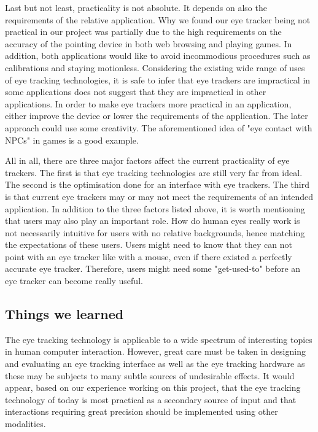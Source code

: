 \documentclass[english]{tktltiki}
\begin{document}
Last but not least, practicality is not absolute. It depends on also the requirements of the relative application. Why we found our eye tracker being not practical in our project was partially due to the high requirements on the accuracy of the pointing device in both web browsing and playing games. In addition, both applications would like to avoid incommodious procedures such as calibrations and staying motionless. Considering the existing wide range of uses of eye tracking technologies, it is safe to infer that eye trackers are impractical in some applications does not suggest that they are impractical in other applications. In order to make eye trackers more practical in an application, either improve the device or lower the requirements of the application. The later approach could use some creativity. The aforementioned idea of "eye contact with NPCs" in games is a good example. 

All in all, there are three major factors affect the current practicality of eye trackers. The first is that eye tracking technologies are still very far from ideal. The second is the optimisation done for an interface with eye trackers. The third is that current eye trackers may or may not meet the requirements of an intended application. In addition to the three factors listed above, it is worth mentioning that users may also play an important role. How do human eyes really work is not necessarily intuitive for users with no relative backgrounds, hence matching the expectations of these users. Users might need to know that they can not point with an eye tracker like with a mouse, even if there existed a perfectly accurate eye tracker. Therefore, users might need some "get-used-to" before an eye tracker can become really useful. 

\subsection{Things we learned}

The eye tracking technology is applicable to a wide spectrum of interesting topics in human computer interaction. However, great care must be taken in designing and evaluating an eye tracking interface as well as the eye tracking hardware as these may be subjects to many subtle sources of undesirable effects. It would appear, based on our experience working on this project, that the eye tracking technology of today is most practical as a secondary source of input and that interactions requiring great precision should be implemented using other modalities.
\end{document}
